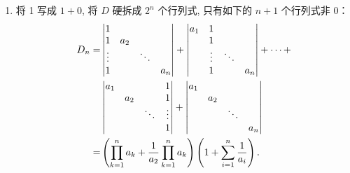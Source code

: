 \begin{exercise}
\begin{exgroup}
\begin{answer}
\begin{enumerate}
                \item 将 1 写成 $1+0$, 将 $D$ 硬拆成 $2^{n}$ 个行列式, 只有如下的 $n+1$ 个行列式非 0：
                      \begin{align*}
                          D_n = & \begin{vmatrix}
                                      1      &       &        &       \\
                                      1      & a_{2} &        &       \\
                                      \vdots &       & \ddots &       \\
                                      1      &       &        & a_{n}
                                  \end{vmatrix}
                          +\begin{vmatrix}
                               a_{1} & 1      &                \\
                                     & 1      &                \\
                                     & \vdots & \ddots &       \\
                                     & 1      &        & a_{n}
                           \end{vmatrix}+\cdots+                    \\
                                & \begin{vmatrix}
                                      a_{1} &       &        & 1      \\
                                            & a_{2} &        & 1      \\
                                            &       & \ddots & \vdots \\
                                            &       &        & 1
                                  \end{vmatrix}
                          +\begin{vmatrix}
                               a_{1} &                      \\
                                     & a_{2} &              \\
                                     &       & \ddots &     \\
                                     &       &        & a_n
                           \end{vmatrix}                       \\
                          =     & \left(\prod_{k=1}^{n} a_{k}+\frac{1}{a_{2}}
                          \prod_{k=1}^{n} a_{k}\right)\left(1+\sum_{i=1}^{n}\limits \frac{1}{a_{i}}\right).
                      \end{align*}
            \end{enumerate}
        \end{answer}


\end{exgroup}
\end{exercise}
